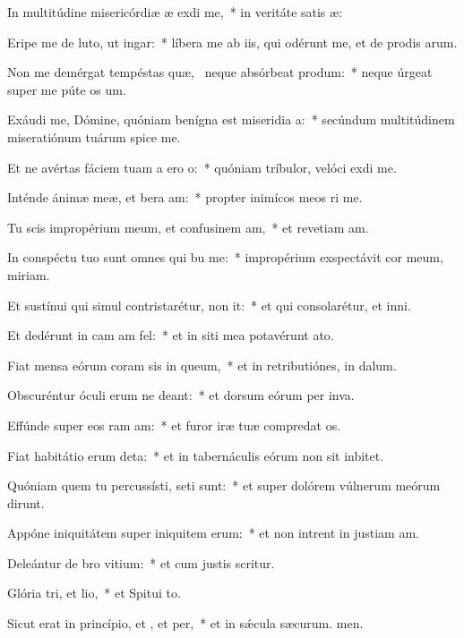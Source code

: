 \item In multitúdine misericórdiæ æ exdi me,~* in veritáte satis æ:
\item Eripe me de luto, ut  ingar:~* líbera me ab iis, qui odérunt me, et de prodis arum.
\item Non me demérgat tempéstas quæ,~\pscross{} neque absórbeat  produm:~* neque úrgeat super me púte os um.
\item Exáudi me, Dómine, quóniam benígna est miseridia a:~* secúndum multitúdinem miseratiónum tuárum spice  me.
\item Et ne avértas fáciem tuam a ero o:~* quóniam tríbulor, velóci exdi me.
\item Inténde ánimæ meæ, et bera am:~* propter inimícos meos ri me.
\item Tu scis impropérium meum, et confusinem am,~* et revetiam am.
\item In conspéctu tuo sunt omnes qui bu me:~* impropérium exspectávit cor meum,  miriam.
\item Et sustínui qui simul contristarétur,  non it:~* et qui consolarétur, et  inni.
\item Et dedérunt in cam am fel:~* et in siti mea potavérunt  ato.
\item Fiat mensa eórum coram sis in queum,~* et in retributiónes,  in dalum.
\item Obscuréntur óculi erum ne deant:~* et dorsum eórum per inva.
\item Effúnde super eos ram am:~* et furor iræ tuæ compredat os.
\item Fiat habitátio erum deta:~* et in tabernáculis eórum non sit  inbitet.
\item Quóniam quem tu percussísti, seti sunt:~* et super dolórem vúlnerum meórum dirunt.
\item Appóne iniquitátem super iniquitem erum:~* et non intrent in justiam am.
\item Deleántur de bro vitium:~* et cum justis  scritur.
\item Glória tri, et lio,~* et Spitui to.
\item Sicut erat in princípio, et , et per,~* et in sǽcula sæcurum. men.
